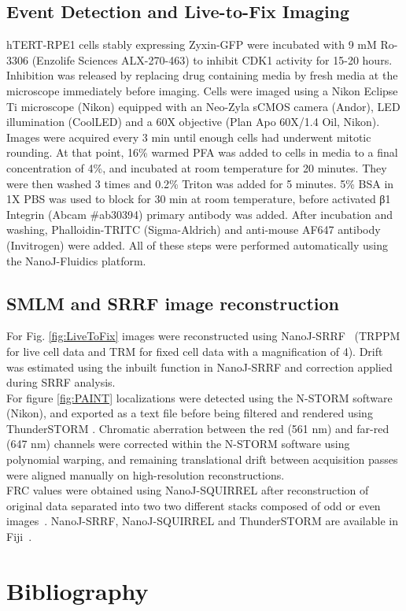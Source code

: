 \subsection*{Event Detection and Live-to-Fix Imaging}
hTERT-RPE1 cells stably expressing Zyxin-GFP were incubated with 9 mM Ro-3306 (Enzolife Sciences ALX-270-463) to inhibit CDK1 activity for 15-20 hours. Inhibition was released by replacing drug containing media by fresh media at the microscope immediately before imaging. Cells were imaged using a Nikon Eclipse Ti microscope (Nikon) equipped with an Neo-Zyla sCMOS camera (Andor), LED illumination (CoolLED) and a 60X objective (Plan Apo 60X/1.4 Oil, Nikon). Images were acquired every 3 min until enough cells had underwent mitotic rounding. At that point, 16\% warmed PFA was added to cells in media to a final concentration of 4\%, and incubated at room temperature for 20 minutes. They were then washed 3 times and 0.2\% Triton was added for 5 minutes. 5\% BSA in 1X PBS was used to block for 30 min at room temperature, before activated β1 Integrin (Abcam \#ab30394) primary antibody was added. After incubation and washing, Phalloidin-TRITC (Sigma-Aldrich) and anti-mouse AF647 antibody (Invitrogen) were added. All of these steps were performed automatically using the NanoJ-Fluidics platform.

\subsection*{SMLM and SRRF image reconstruction}
For Fig. \ref{fig:LiveToFix} images were reconstructed using NanoJ-SRRF~\cite{gustafsson2016fast} (TRPPM for live cell data and TRM for fixed cell data with a magnification of 4). Drift was estimated using the inbuilt function in NanoJ-SRRF and correction applied during SRRF analysis.\\
For figure \ref{fig:PAINT} localizations were detected using the N-STORM software (Nikon), and exported as a text file before being filtered and rendered using ThunderSTORM \cite{ovesny2014thunderstorm}. Chromatic aberration between the red (561 nm) and far-red (647 nm) channels were corrected within the N-STORM software using polynomial warping, and remaining translational drift between acquisition passes were aligned manually on high-resolution reconstructions.\\
FRC values were obtained using NanoJ-SQUIRREL after reconstruction of original data separated into two two different stacks composed of odd or even images~\cite{culley2018quantitative}. 
NanoJ-SRRF, NanoJ-SQUIRREL and ThunderSTORM are available in Fiji~\cite{schindelin2012fiji}.\\



\section*{Bibliography}

